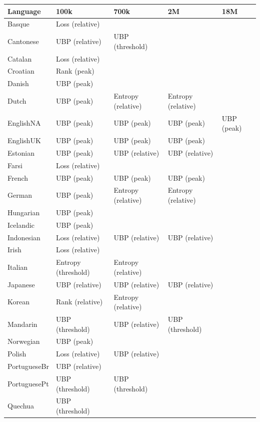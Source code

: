 \begin{table}[t]
    \centering
    \small
    \begin{tabular}{lllll}
    \toprule
    Language & 100k & 700k & 2M & 18M \\
    \midrule
    Basque & Loss (relative) &  &  &  \\
    Cantonese & UBP (relative) & UBP (threshold) &  &  \\
    Catalan & Loss (relative) &  &  &  \\
    Croatian & Rank (peak) &  &  &  \\
    Danish & UBP (peak) &  &  &  \\
    Dutch & UBP (peak) & Entropy (relative) & Entropy (relative) &  \\
    EnglishNA & UBP (peak) & UBP (peak) & UBP (peak) & UBP (peak) \\
    EnglishUK & UBP (peak) & UBP (peak) & UBP (peak) &  \\
    Estonian & UBP (peak) & UBP (relative) & UBP (relative) &  \\
    Farsi & Loss (relative) &  &  &  \\
    French & UBP (peak) & UBP (peak) & UBP (peak) &  \\
    German & UBP (peak) & Entropy (relative) & Entropy (relative) &  \\
    Hungarian & UBP (peak) &  &  &  \\
    Icelandic & UBP (peak) &  &  &  \\
    Indonesian & Loss (relative) & UBP (relative) & UBP (relative) &  \\
    Irish & Loss (relative) &  &  &  \\
    Italian & Entropy (threshold) & Entropy (relative) &  &  \\
    Japanese & UBP (relative) & UBP (relative) & UBP (relative) &  \\
    Korean & Rank (relative) & Entropy (relative) &  &  \\
    Mandarin & UBP (threshold) & UBP (relative) & UBP (threshold) &  \\
    Norwegian & UBP (peak) &  &  &  \\
    Polish & Loss (relative) & UBP (relative) &  &  \\
    PortugueseBr & UBP (relative) &  &  &  \\
    PortuguesePt & UBP (threshold) & UBP (threshold) &  &  \\
    Quechua & UBP (threshold) &  &  &  \\

\end{tabular}
\end{table}
